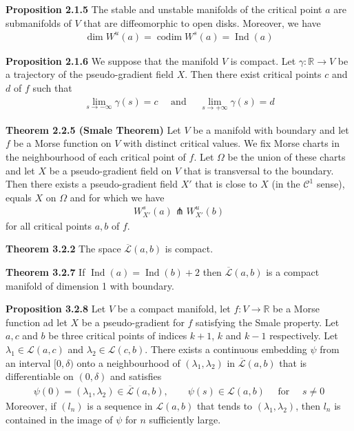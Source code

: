 \documentclass[hidelinks, 12pt]{article}
\DeclareMathOperator{\codim}{codim}
\DeclareMathOperator{\Ind}{Ind}
\theoremstyle{mydefstyle}
\theoremstyle{mythmstyle}
\newcounter{prop}
\begin{document}
\textbf{Proposition 2.1.5} The stable and unstable manifolds of the critical point $a$ are submanifolds of $V$ that are diffeomorphic to open disks. Moreover, we have
\begin{gather*}
\dim W^u(a) = \codim W^s(a) = \Ind(a)
\end{gather*}

\textbf{Proposition 2.1.6} We suppose that the manifold $V$ is compact. Let $\gamma : \mathbb{R} \to V$ be a trajectory of the pseudo-gradient field $X$. Then there exist critical points $c$ and $d$ of $f$ such that
\begin{gather*}
\lim_{s\to-\infty} \gamma(s) = c \quad\mbox{ and }\quad \lim_{s\to+\infty} \gamma(s) = d
\end{gather*}

\textbf{Theorem 2.2.5 (Smale Theorem)} Let $V$ be a manifold with boundary and let $f$ be a Morse function on $V$ with distinct critical values. We fix Morse charts in the neighbourhood of each critical point of $f$. Let $\Omega$ be the union of these charts and let $X$ be a pseudo-gradient field on $V$ that is transversal to the boundary. Then there exists a pseudo-gradient field $X'$ that is close to $X$ (in the $\mathcal{C}^1$ sense), equals $X$ on $\Omega$ and for which we have
\begin{gather*}
W^s_{X'}(a) \pitchfork W^u_{X'}(b)
\end{gather*}
for all critical points $a, b$ of $f$.

\textbf{Theorem 3.2.2} The space $\overline{\mathcal{L}}(a, b)$ is compact. 

\textbf{Theorem 3.2.7} If $\Ind(a) = \Ind(b) + 2$ then $\overline{\mathcal{L}}(a, b)$ is a compact manifold of dimension 1 with boundary. 

\textbf{Proposition 3.2.8} Let $V$ be a compact manifold, let $f : V \to \mathbb{R}$ be a Morse function ad let $X$ be a pseudo-gradient for $f$ satisfying the Smale property. Let $a, c$ and $b$ be three critical points of indices $k+1$, $k$ and $k-1$ respectively. Let $\lambda_1 \in \mathcal{L}(a, c)$ and $\lambda_2 \in \mathcal{L}(c, b)$. There exists a continuous embedding $\psi$ from an interval $[0, \delta)$ onto a neighbourhood of $(\lambda_1, \lambda_2)$ in $\overline{\mathcal{L}}(a, b)$ that is differentiable on $(0, \delta)$ and satisfies
\begin{gather*}
\psi(0) = (\lambda_1, \lambda_2) \in \overline{\mathcal{L}}(a, b), \qquad \psi(s) \in \mathcal{L}(a, b) \quad\mbox{ for }\quad s \ne 0
\end{gather*}
Moreover, if $(l_n)$ is a sequence in $\mathcal{L}(a, b)$ that tends to $(\lambda_1, \lambda_2)$, then $l_n$ is contained in the image of $\psi$ for $n$ sufficiently large. 
\end{document}
